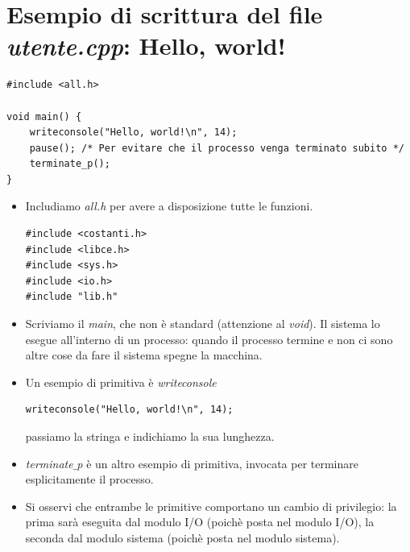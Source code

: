 \documentclass[11pt]{report}
\theoremstyle{definition}
\begin{document}
\section{Esempio di scrittura del file \emph{utente.cpp}:  Hello, world!}
\small
\begin{verbatim}
#include <all.h>

void main() {
    writeconsole("Hello, world!\n", 14);
    pause(); /* Per evitare che il processo venga terminato subito */
    terminate_p();
}
\end{verbatim}
\normalsize
\begin{itemize}
\item Includiamo \emph{all.h} per avere a disposizione tutte le funzioni.
\begin{verbatim}
#include <costanti.h>
#include <libce.h>
#include <sys.h>
#include <io.h>
#include "lib.h"
\end{verbatim}
\item Scriviamo il \emph{main}, che non è standard (attenzione al \emph{void}). Il sistema lo esegue all'interno di un processo: quando il processo termine e non ci sono altre cose da fare il sistema spegne la macchina.
\item Un esempio di primitiva è \emph{writeconsole}
\begin{verbatim}
writeconsole("Hello, world!\n", 14);
\end{verbatim}
passiamo la stringa e indichiamo la sua lunghezza.
\item \emph{terminate$\_$p} è un altro esempio di primitiva, invocata per terminare esplicitamente il processo.
\item Si osservi che entrambe le primitive comportano un cambio di privilegio: la prima sarà eseguita dal modulo I/O (poichè posta nel modulo I/O), la seconda dal modulo sistema (poichè posta nel modulo sistema).
\end{itemize}
\end{document}
